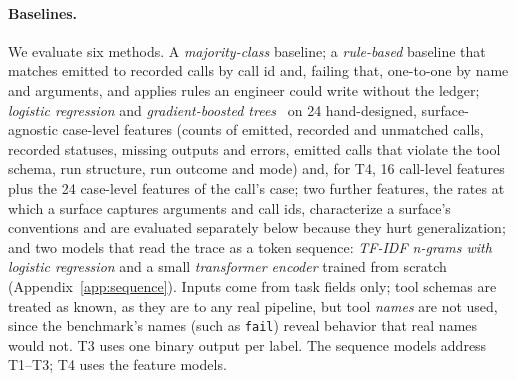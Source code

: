 \documentclass[10pt]{article}
\begin{document}
\paragraph{Baselines.} We evaluate six methods. A \emph{majority-class} baseline; a \emph{rule-based} baseline that matches emitted to recorded calls by call id and, failing that, one-to-one by name and arguments, and applies rules an engineer could write without the ledger; \emph{logistic regression} and \emph{gradient-boosted trees}~\citep{pedregosa2011sklearn} on 24 hand-designed, surface-agnostic case-level features (counts of emitted, recorded and unmatched calls, recorded statuses, missing outputs and errors, emitted calls that violate the tool schema, run structure, run outcome and mode) and, for T4, 16 call-level features plus the 24 case-level features of the call's case; two further features, the rates at which a surface captures arguments and call ids, characterize a surface's conventions and are evaluated separately below because they hurt generalization; and two models that read the trace as a token sequence: \emph{TF-IDF n-grams with logistic regression} and a small \emph{transformer encoder} trained from scratch (Appendix~\ref{app:sequence}). Inputs come from task fields only; tool schemas are treated as known, as they are to any real pipeline, but tool \emph{names} are not used, since the benchmark's names (such as \texttt{fail}) reveal behavior that real names would not. T3 uses one binary output per label. The sequence models address T1--T3; T4 uses the feature models.

\begin{table}[t]
\centering\small
{}
\caption{RQ5: detection without the ledger, on the held-out test frameworks. F1 treats the defect (incomplete, unfaithful) as the positive class. Sequence models: mean $\pm$ standard deviation over three training seeds (TF-IDF is deterministic).}
\label{tab:tasks}
\end{table}
\end{document}

